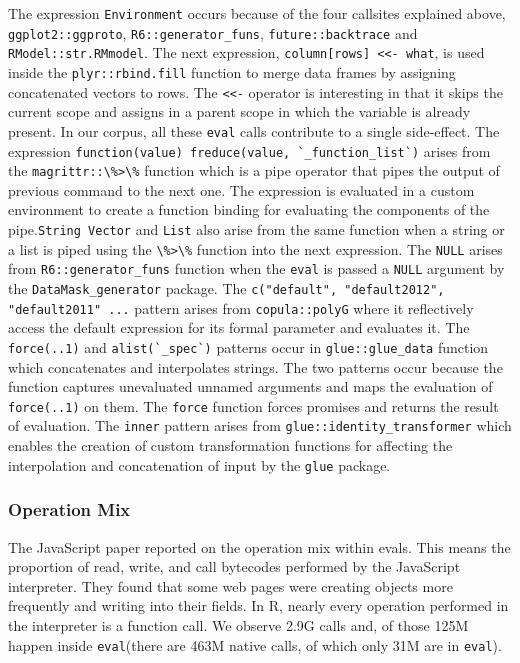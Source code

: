 \documentclass[a4paper,USenglish,cleveref, autoref, thm-restate]{lipics-v2019}
\newcommand{\eval}{\texttt{eval}\xspace}
\newcommand{\evals}{{\sf eval}s\xspace}
\renewcommand{\c}[1]{\lstinline{#1}\xspace}
\begin{document}
The expression \c{Environment} occurs because of the four callsites
explained above, \c{ggplot2::ggproto}, \c{R6::generator_funs},
\c{future::backtrace} and \c{RModel::str.RMmodel}. The next expression,
\c{column[rows] <<- what}, is used inside the \c{plyr::rbind.fill} function
to merge data frames by assigning concatenated vectors to rows. The \c{<<-}
operator is interesting in that it skips the current scope and assigns in a
parent scope in which the variable is already present. In our corpus, all
these \eval calls contribute to a single side-effect. The expression
\c{function(value) freduce(value, `_function_list`)} arises from the
\c{magrittr::\%>\%} function which is a pipe operator that pipes the output
of previous command to the next one. The expression is evaluated in a custom
environment to create a function binding for evaluating the components of
the pipe.\c{String Vector} and \c{List} also arise from the same function
when a string or a list is piped using the \c{\%>\%} function into the next
expression.  The \c{NULL} arises from \c{R6::generator_funs} function when
the \eval is passed a \c{NULL} argument by the \c{DataMask_generator}
package. The \c{c("default", "default2012", "default2011" ...} pattern
arises from \c{copula::polyG} where it reflectively access the default
expression for its formal parameter and evaluates it. The \c{force(..1)} and
\c{alist(`_spec`)} patterns occur in \c{glue::glue_data} function which
concatenates and interpolates strings. The two patterns occur because the
function captures unevaluated unnamed arguments and maps the evaluation of
\c{force(..1)} on them.  The \c{force} function forces promises and returns
the result of evaluation. The \c{inner} pattern arises from
\c{glue::identity_transformer} which enables the creation of custom
transformation functions for affecting the interpolation and concatenation
of input by the \c{glue} package.


\subsubsection{Operation Mix}

The JavaScript paper reported on the operation mix within \evals. This means
the proportion of read, write, and call bytecodes performed by the
JavaScript interpreter. They found that some web pages were creating objects
more frequently and writing into their fields.  In R, nearly every operation
performed in the interpreter is a function call. We observe 2.9G calls and,
of those 125M happen inside \eval (there are 463M native calls, of which
only 31M are in \eval).
\end{document}
